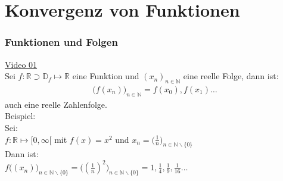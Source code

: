 \chapter{Konvergenz von Funktionen}

\setcounter{section}{5}
\setcounter{subsection}{0}
\setcounter{subsubsection}{1}
\setcounter{secnumdepth}{3}
\subsection{Funktionen und Folgen}
\href{https://youtu.be/uTHOemsexgc}{Video 01}\\
Sei $ f:\mathbb{R}\supset \mathbb{D}_f\longmapsto \mathbb{R} $ eine Funktion und $ (x_n)_{n\in\mathbb{N}} $ eine reelle Folge, dann ist:\\
\begin{align*}
\bigg(f(x_n)\bigg)_{n\in\mathbb{N}}=f(x_0), f(x_1)\ldots
\end{align*}
auch eine reelle Zahlenfolge.\vspace*{4mm}\\
Beispiel:\\
Sei:\\
$ f:\mathbb{R}\longmapsto [0,\infty[ $ mit $ f(x)=x^2 $ und $x_n= \big(\frac{1}{n}\big)_{n\in\mathbb{N}\backslash\{0\}} $\\
Dann ist:\\
$ f\big((x_n)\big)_{n\in\mathbb{N}\backslash\{0\}} =\big((\frac{1}{n})^2\big)_{n\in\mathbb{N}\backslash\{0\}}=1,\frac{1}{4},\frac{1}{9},\frac{1}{16}\ldots$\\

